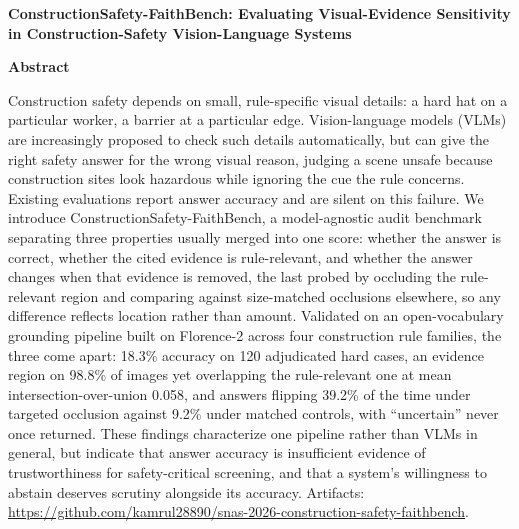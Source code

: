 \documentclass[12pt,letterpaper,twoside]{article}
\begin{document}
\begin{center}
\textbf{ConstructionSafety-FaithBench: Evaluating Visual-Evidence Sensitivity in Construction-Safety Vision-Language Systems}
\end{center}

\begin{center}
\textbf{Abstract}
\end{center}

Construction safety depends on small, rule-specific visual details: a hard hat on a particular worker, a barrier at a particular edge. Vision-language models (VLMs) are increasingly proposed to check such details automatically, but can give the right safety answer for the wrong visual reason, judging a scene unsafe because construction sites look hazardous while ignoring the cue the rule concerns. Existing evaluations report answer accuracy and are silent on this failure. We introduce ConstructionSafety-FaithBench, a model-agnostic audit benchmark separating three properties usually merged into one score: whether the answer is correct, whether the cited evidence is rule-relevant, and whether the answer changes when that evidence is removed, the last probed by occluding the rule-relevant region and comparing against size-matched occlusions elsewhere, so any difference reflects location rather than amount. Validated on an open-vocabulary grounding pipeline built on Florence-2 across four construction rule families, the three come apart: 18.3\% accuracy on 120 adjudicated hard cases, an evidence region on 98.8\% of images yet overlapping the rule-relevant one at mean intersection-over-union 0.058, and answers flipping 39.2\% of the time under targeted occlusion against 9.2\% under matched controls, with ``uncertain'' never once returned. These findings characterize one pipeline rather than VLMs in general, but indicate that answer accuracy is insufficient evidence of trustworthiness for safety-critical screening, and that a system's willingness to abstain deserves scrutiny alongside its accuracy. Artifacts: \url{https://github.com/kamrul28890/snas-2026-construction-safety-faithbench}.
\end{document}
